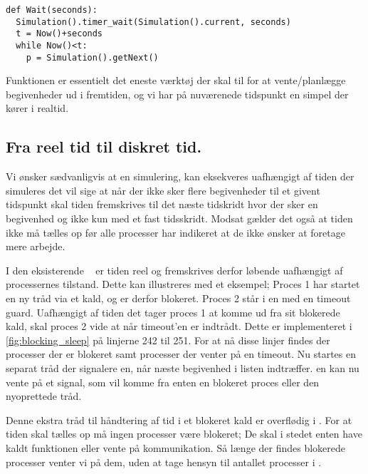 \begin{lstlisting}[firstnumber=20,float=hbtp, label=wait, caption=Wait i simuleringsversionen.] 
def Wait(seconds): 
  Simulation().timer_wait(Simulation().current, seconds) 
  t = Now()+seconds
  while Now()<t: 
    p = Simulation().getNext() 
\end{lstlisting}

Funktionen  er essentielt det eneste værktøj der skal til for at vente/planlægge begivenheder ud i fremtiden, og vi har på nuværenede tidspunkt en simpel \des der kører i realtid. 

\subsection{Fra reel tid til diskret tid.}\label{sec:discrete}
Vi ønsker sædvanligvis at en simulering, kan eksekveres uafhængigt af tiden der simuleres det vil sige at når der ikke sker flere begivenheder til et givent tidspunkt skal tiden fremskrives til det næste tidskridt hvor der sker en begivenhed og ikke kun med et fast tidsskridt. Modsat gælder det også at tiden ikke må tælles op før alle processer har indikeret at de ikke ønsker at foretage mere arbejde. 

I den eksisterende \sched ~ er tiden reel og fremskrives derfor løbende uafhængigt af processernes tilstand. Dette kan illustreres med et eksempel; Proces 1 har startet en ny tråd via et  kald, og er derfor blokeret. Proces 2 står i en  med en timeout guard. Uafhængigt af tiden det tager proces 1 at komme ud fra sit blokerede kald, skal proces 2 vide at når timeout'en er indtrådt. Dette er implementeret i \cref{fig:blocking_sleep} på linjerne 242 til 251. For at nå disse linjer findes der processer der er blokeret samt processer der venter på en timeout. Nu startes en separat tråd der signalere \sched en, når næste begivenhed i  listen indtræffer. \Sched en kan nu vente på et signal, som vil komme fra enten en blokeret proces eller den nyoprettede tråd.

Denne ekstra tråd til håndtering af tid i et blokeret kald er overflødig i \des. For at tiden skal tælles op må ingen processer være blokeret; De skal i stedet enten have kaldt funktionen  eller vente på kommunikation.  
Så længe der findes blokerede processer venter vi på dem, uden at tage hensyn til antallet processer i .

